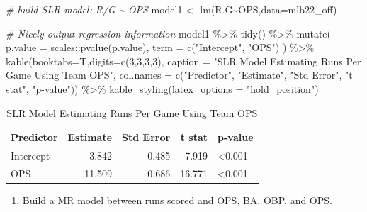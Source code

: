 \documentclass[
  11pt,
]{book}
\newenvironment{Shaded}{\begin{snugshade}}{\end{snugshade}}
\newcommand{\AttributeTok}[1]{\textcolor[rgb]{0.77,0.63,0.00}{#1}}
\newcommand{\CommentTok}[1]{\textcolor[rgb]{0.56,0.35,0.01}{\textit{#1}}}
\newcommand{\DecValTok}[1]{\textcolor[rgb]{0.00,0.00,0.81}{#1}}
\newcommand{\FunctionTok}[1]{\textcolor[rgb]{0.00,0.00,0.00}{#1}}
\newcommand{\NormalTok}[1]{#1}
\newcommand{\OtherTok}[1]{\textcolor[rgb]{0.56,0.35,0.01}{#1}}
\newcommand{\SpecialCharTok}[1]{\textcolor[rgb]{0.00,0.00,0.00}{#1}}
\newcommand{\StringTok}[1]{\textcolor[rgb]{0.31,0.60,0.02}{#1}}
\providecommand{\tightlist}{%
  \setlength{\itemsep}{0pt}\setlength{\parskip}{0pt}}
\theoremstyle{definition}
\theoremstyle{definition}
\theoremstyle{definition}
\theoremstyle{definition}
\theoremstyle{remark}
\begin{document}
\begin{Shaded}
\begin{Highlighting}[]
\CommentTok{\# build SLR model: R/G \textasciitilde{} OPS}
\NormalTok{model1 }\OtherTok{\textless{}{-}} \FunctionTok{lm}\NormalTok{(R.G}\SpecialCharTok{\textasciitilde{}}\NormalTok{OPS,}\AttributeTok{data=}\NormalTok{mlb22\_off)}

\CommentTok{\# Nicely output regression information}
\NormalTok{model1 }\SpecialCharTok{\%\textgreater{}\%} \FunctionTok{tidy}\NormalTok{() }\SpecialCharTok{\%\textgreater{}\%}
  \FunctionTok{mutate}\NormalTok{(}
    \AttributeTok{p.value =}\NormalTok{ scales}\SpecialCharTok{::}\FunctionTok{pvalue}\NormalTok{(p.value),}
    \AttributeTok{term =} \FunctionTok{c}\NormalTok{(}\StringTok{"Intercept"}\NormalTok{, }\StringTok{"OPS"}\NormalTok{)}
\NormalTok{  ) }\SpecialCharTok{\%\textgreater{}\%}
  \FunctionTok{kable}\NormalTok{(}\AttributeTok{booktabs=}\NormalTok{T,}\AttributeTok{digits=}\FunctionTok{c}\NormalTok{(}\DecValTok{3}\NormalTok{,}\DecValTok{3}\NormalTok{,}\DecValTok{3}\NormalTok{,}\DecValTok{3}\NormalTok{), }
        \AttributeTok{caption =} \StringTok{"SLR Model Estimating Runs Per Game Using Team OPS"}\NormalTok{,}
        \AttributeTok{col.names =} \FunctionTok{c}\NormalTok{(}\StringTok{"Predictor"}\NormalTok{, }\StringTok{"Estimate"}\NormalTok{, }\StringTok{"Std Error"}\NormalTok{, }\StringTok{"t stat"}\NormalTok{, }\StringTok{"p{-}value"}\NormalTok{)) }\SpecialCharTok{\%\textgreater{}\%}
  \FunctionTok{kable\_styling}\NormalTok{(}\AttributeTok{latex\_options =} \StringTok{"hold\_position"}\NormalTok{)}
\end{Highlighting}
\end{Shaded}

\begin{table}[!h]

\caption{\label{tab:unnamed-chunk-225}SLR Model Estimating Runs Per Game Using Team OPS}
\centering
\begin{tabular}[t]{lrrrl}
\toprule
Predictor & Estimate & Std Error & t stat & p-value\\
\midrule
Intercept & -3.842 & 0.485 & -7.919 & <0.001\\
OPS & 11.509 & 0.686 & 16.771 & <0.001\\
\bottomrule
\end{tabular}
\end{table}

\newpage

\begin{enumerate}
\def\labelenumi{(\alph{enumi})}
\setcounter{enumi}{3}
\tightlist
\item
  Build a MR model between runs scored and OPS, BA, OBP, and OPS.
\end{enumerate}
\end{document}
